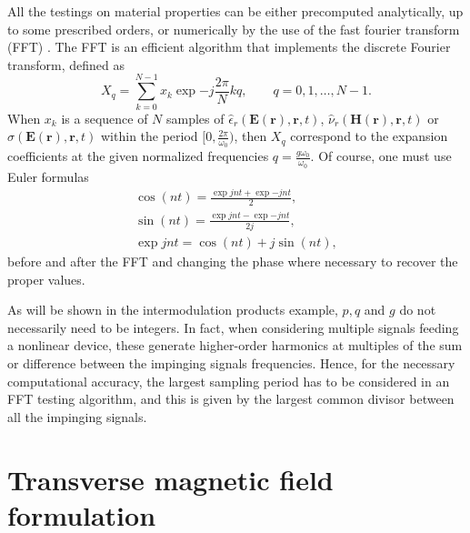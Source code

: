 All the testings on material properties can be either precomputed analytically, up to some prescribed orders, or numerically by the use of the fast fourier transform (FFT) \cite{frigo2005design}. The FFT is an efficient algorithm that implements the discrete Fourier transform, defined as
\begin{equation}
X_q = \sum_{k=0}^{N-1} x_k \exp{-j \frac{2\pi}{N} k q}, \qquad q=0,1,\ldots,N-1.
\end{equation}
\noindent When $x_k$ is a sequence of $N$ samples of $\hat{\epsilon}_r(\mathbf{E}(\mathbf{r}),\mathbf{r}, t)$, $\hat{\nu}_r(\mathbf{H}(\mathbf{r}),\mathbf{r}, t)$ or $\hat{\sigma}(\mathbf{E}(\mathbf{r}),\mathbf{r}, t)$ within the period $[0, \frac{2\pi}{\omega_0})$, then $X_q$ correspond to the expansion coefficients at the given normalized frequencies $q = \frac{g \omega_0}{\omega_0}$. Of course, one must use Euler formulas 
\begin{gather}
\cos (nt) = \frac{\exp{jnt} + \exp{-jnt}}{2},\\
\sin (nt) = \frac{\exp{jnt} - \exp{-jnt}}{2j},\\
\exp {jnt} = \cos(nt) + j \sin(nt),
\end{gather}
\noindent before and after the FFT and changing the phase where necessary to recover the proper values.

As will be shown in the intermodulation products example, $p, q$ and $g$ do not necessarily need to be integers. In fact, when considering multiple signals feeding a nonlinear device, these generate higher-order harmonics at multiples of the sum or difference between the impinging signals frequencies. Hence, for the necessary computational accuracy, the largest sampling period has to be considered in an FFT testing algorithm, and this is given by the largest common divisor between all the impinging signals.

\section{Transverse magnetic field formulation}

